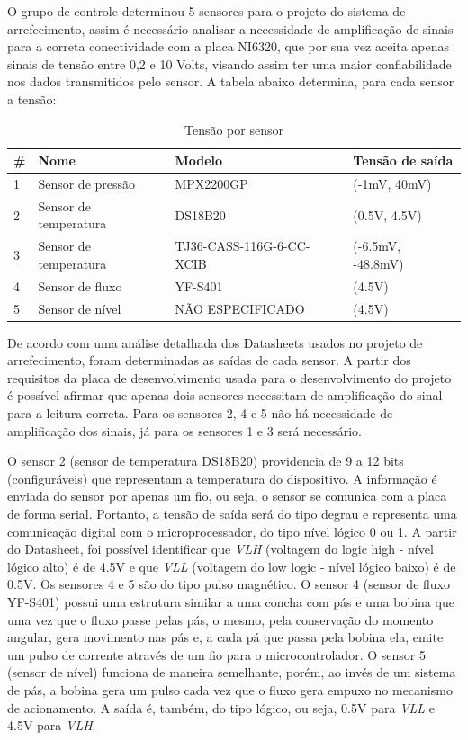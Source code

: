 O grupo de controle determinou 5 sensores para o projeto do sistema de arrefecimento, assim é necessário analisar a necessidade de amplificação de sinais para a correta conectividade com a placa NI6320, que por sua vez aceita apenas sinais de tensão entre 0,2 e 10 Volts, visando assim ter uma maior confiabilidade nos dados transmitidos pelo sensor.
A tabela abaixo determina, para cada sensor a tensão:

\begin{table}[]
    \centering
    \begin{tabular}{|p{3cm}|p{5cm}|p{3cm}|p{3cm}|}
    \hline
    \textbf{\#} & \textbf{Nome}    & \textbf{Modelo} & \textbf{Tensão de saída} \\ \hline
    1      & Sensor de pressão & MPX2200GP  & (-1mV, 40mV)  \\ \hline
    2 & Sensor de temperatura & DS18B20 & (0.5V, 4.5V) \\ \hline
    3 & Sensor de temperatura & TJ36-CASS-116G-6-CC-XCIB & (-6.5mV, -48.8mV) \\ \hline
    4 & Sensor de fluxo & YF-S401 & (4.5V) \\ \hline
    5 & Sensor de nível & NÃO ESPECIFICADO & (4.5V) \\ \hline
    \end{tabular}
    \caption{Tensão por sensor}
    \end{table}

De acordo com uma análise detalhada dos Datasheets usados no projeto de arrefecimento, foram determinadas as saídas de cada sensor. A partir dos requisitos da placa de desenvolvimento usada para o desenvolvimento do projeto é possível afirmar que apenas dois sensores necessitam de amplificação do sinal para a leitura correta. Para os sensores 2, 4 e 5 não há necessidade de amplificação dos sinais, já para os sensores 1 e 3 será necessário. 

O sensor 2 (sensor de temperatura DS18B20) providencia de 9 a 12 bits (configuráveis) que representam a temperatura do dispositivo. A informação é enviada do sensor por apenas um fio, ou seja, o sensor se comunica com a placa de forma serial. Portanto, a tensão de saída será do tipo degrau e representa uma comunicação digital com o microprocessador, do tipo nível lógico 0 ou 1. A partir do Datasheet, foi possível identificar que \textit{VLH} (voltagem do logic high - nível lógico alto) é de 4.5V e que \textit{VLL} (voltagem do low logic - nível lógico baixo) é de 0.5V.
Os sensores 4 e 5 são do tipo pulso magnético. O sensor 4 (sensor de fluxo YF-S401) possui uma estrutura similar a uma concha com pás e uma bobina que uma vez que o fluxo passe pelas pás, o mesmo, pela conservação do momento angular, gera movimento nas pás e, a cada pá que passa pela bobina ela, emite um pulso de corrente através de um fio para o microcontrolador. O sensor 5 (sensor de nível) funciona de maneira semelhante, porém, ao invés de um sistema de pás, a bobina gera um pulso cada vez que o fluxo gera empuxo no mecanismo de acionamento. A saída é, também, do tipo lógico, ou seja, 0.5V para \textit{VLL} e 4.5V para \textit{VLH}.

